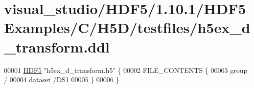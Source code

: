\hypertarget{visual__studio_2_h_d_f5_21_810_81_2_h_d_f5_examples_2_c_2_h5_d_2testfiles_2h5ex__d__transform_8ddl_source}{}\section{visual\+\_\+studio/\+H\+D\+F5/1.10.1/\+H\+D\+F5\+Examples/\+C/\+H5\+D/testfiles/h5ex\+\_\+d\+\_\+transform.ddl}
\label{visual__studio_2_h_d_f5_21_810_81_2_h_d_f5_examples_2_c_2_h5_d_2testfiles_2h5ex__d__transform_8ddl_source}

\begin{DoxyCode}
00001 \hyperlink{namespace_h_d_f5}{HDF5} \textcolor{stringliteral}{"h5ex\_d\_transform.h5"} \{
00002 FILE\_CONTENTS \{
00003  group      /
00004  dataset    /DS1
00005  \}
00006 \}
\end{DoxyCode}

